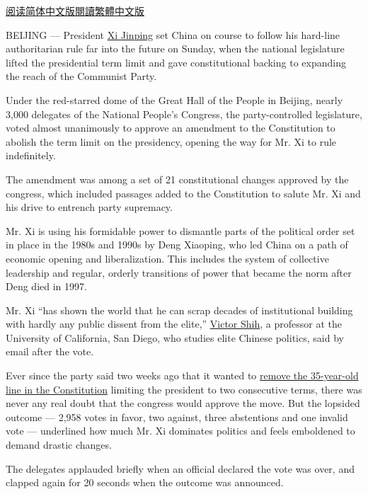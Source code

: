 \href{https://cn.nytimes.com/china/20180311/china-xi-constitution-term-limits/}{阅读简体中文版}\href{https://cn.nytimes.com/china/20180311/china-xi-constitution-term-limits/zh-hant/}{閱讀繁體中文版}

BEIJING --- President
\href{https://www.nytimes.com/topic/person/xi-jinping}{Xi Jinping} set
China on course to follow his hard-line authoritarian rule far into the
future on Sunday, when the national legislature lifted the presidential
term limit and gave constitutional backing to expanding the reach of the
Communist Party.

Under the red-starred dome of the Great Hall of the People in Beijing,
nearly 3,000 delegates of the National People's Congress, the
party-controlled legislature, voted almost unanimously to approve an
amendment to the Constitution to abolish the term limit on the
presidency, opening the way for Mr. Xi to rule indefinitely.

The amendment was among a set of 21 constitutional changes approved by
the congress, which included passages added to the Constitution to
salute Mr. Xi and his drive to entrench party supremacy.

Mr. Xi is using his formidable power to dismantle parts of the political
order set in place in the 1980s and 1990s by Deng Xiaoping, who led
China on a path of economic opening and liberalization. This includes
the system of collective leadership and regular, orderly transitions of
power that became the norm after Deng died in 1997.

Mr. Xi ``has shown the world that he can scrap decades of institutional
building with hardly any public dissent from the elite,''
\href{https://gps.ucsd.edu/faculty-directory/victor-shih.html}{Victor
Shih}, a professor at the University of California, San Diego, who
studies elite Chinese politics, said by email after the vote.

Ever since the party said two weeks ago that it wanted to
\href{https://www.nytimes.com/2018/02/25/world/asia/china-xi-jinping.html}{remove
the 35-year-old line in the Constitution} limiting the president to two
consecutive terms, there was never any real doubt that the congress
would approve the move. But the lopsided outcome --- 2,958 votes in
favor, two against, three abstentions and one invalid vote ---
underlined how much Mr. Xi dominates politics and feels emboldened to
demand drastic changes.

The delegates applauded briefly when an official declared the vote was
over, and clapped again for 20 seconds when the outcome was announced.

